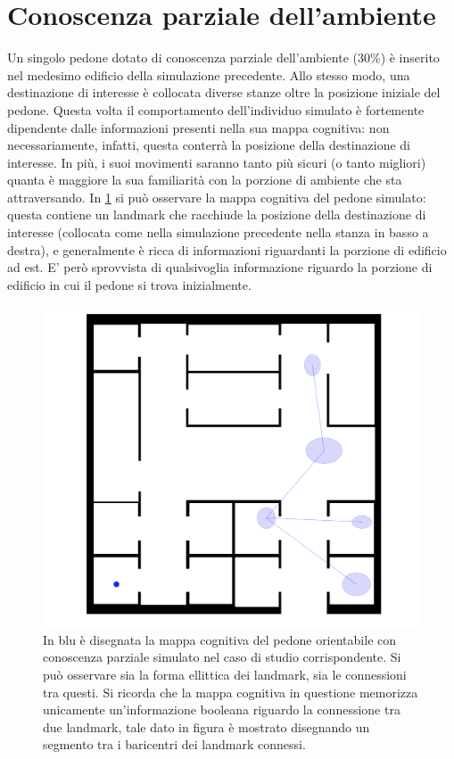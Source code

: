 \documentclass[12pt,a4paper,openright,oneside]{book}
\begin{document}
\section{Conoscenza parziale dell'ambiente}
\label{partial-knowledge-case-study}
Un singolo pedone dotato di conoscenza parziale dell'ambiente (30\%) è inserito nel medesimo edificio della simulazione precedente. Allo stesso modo, una destinazione di interesse è collocata diverse stanze oltre la posizione iniziale del pedone. Questa volta il comportamento dell'individuo simulato è fortemente dipendente dalle informazioni presenti nella sua mappa cognitiva: non necessariamente, infatti, questa conterrà la posizione della destinazione di interesse. In più, i suoi movimenti saranno tanto più sicuri (o tanto migliori) quanta è maggiore la sua familiarità con la porzione di ambiente che sta attraversando. In \cref{fig:partial-knowledge-cognitive-map} si può osservare la mappa cognitiva del pedone simulato: questa contiene un landmark che racchiude la posizione della destinazione di interesse (collocata come nella simulazione precedente nella stanza in basso a destra), e generalmente è ricca di informazioni riguardanti la porzione di edificio ad est. E' però sprovvista di qualsivoglia informazione riguardo la porzione di edificio in cui il pedone si trova inizialmente.
\begin{figure}
	\centering
	\includegraphics[width=0.7\linewidth]{figures/partial-knowledge-cognitive-map.png}
	\caption{In blu è disegnata la mappa cognitiva del pedone orientabile con conoscenza parziale simulato nel caso di studio corrispondente. Si può osservare sia la forma ellittica dei landmark, sia le connessioni tra questi. Si ricorda che la mappa cognitiva in questione memorizza unicamente un'informazione booleana riguardo la connessione tra due landmark, tale dato in figura è mostrato disegnando un segmento tra i baricentri dei landmark connessi.}
	\label{fig:partial-knowledge-cognitive-map}
\end{figure}
\end{document}

